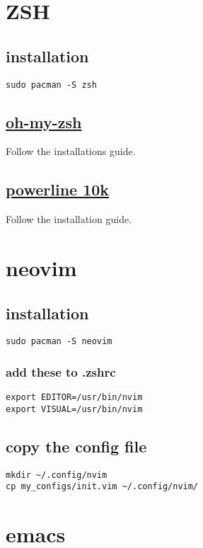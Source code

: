 \documentclass[11pt]{article}
\begin{document}
\section{ZSH}
\label{sec:org4d7a8c6}
\subsection{installation}
\label{sec:orgd43b480}
\begin{verbatim}
sudo pacman -S zsh
\end{verbatim}
\subsection{\href{https://github.com/ohmyzsh/ohmyzsh}{oh-my-zsh}}
\label{sec:org8f3e408}
Follow the installations guide.\\
\subsection{\href{https://github.com/romkatv/powerlevel10k}{powerline 10k}}
\label{sec:org4dc6e24}
Follow the installation guide.\\
\section{neovim}
\label{sec:orgc61b32b}
\subsection{installation}
\label{sec:org1b695f8}
\begin{verbatim}
sudo pacman -S neovim
\end{verbatim}
\subsubsection{add these to .zshrc}
\label{sec:orgdd08969}
\begin{verbatim}
export EDITOR=/usr/bin/nvim
export VISUAL=/usr/bin/nvim
\end{verbatim}
\subsection{copy the config file}
\label{sec:org2cd8f94}
\begin{verbatim}
mkdir ~/.config/nvim
cp my_configs/init.vim ~/.config/nvim/
\end{verbatim}
\section{emacs}
\label{sec:orge1017c6}
\end{document}
